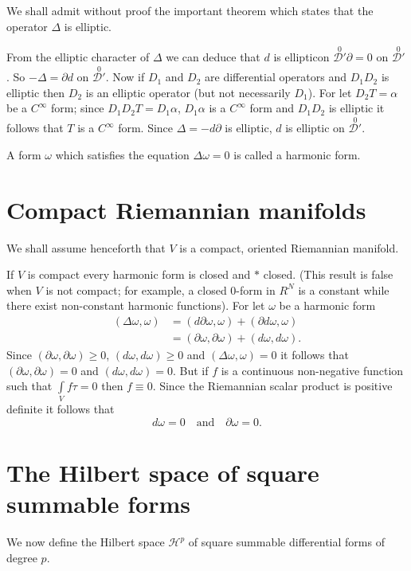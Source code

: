 We shall admit without proof the important theorem which states that
the operator $\Delta$ is elliptic.

From the elliptic character of $\Delta$ we can deduce that $d$ is
elliptic\pageoriginale on $\overset{0}{\mathscr{D}'}\partial =0$ on
$\overset{0}{\mathscr{D}'}$. So $-\Delta=\partial d$ on
$\overset{0}{\mathscr{D}'}$. Now if $D_{1}$ and $D_{2}$ are
differential operators and $D_{1}D_{2}$ is elliptic then $D_{2}$ is an
elliptic operator (but not necessarily $D_{1}$). For let
$D_{2}T=\alpha$ be a $C^{\infty}$ form; since
$D_{1}D_{2}T=D_{1}\alpha$, $D_{1}\alpha$ is a $C^{\infty}$ form and
$D_{1}D_{2}$ is elliptic it follows that $T$ is a $C^{\infty}$
form. Since $\Delta=-d\partial$ is elliptic, $d$ is elliptic on
$\overset{0}{\mathscr{D}'}$. 

A form $\omega$ which satisfies the equation $\Delta\omega=0$ is
called a harmonic form.

\section*{Compact Riemannian manifolds}

We shall assume henceforth that $V$ is a compact, oriented Riemannian
manifold.

If $V$ is compact every harmonic form is closed and $\ast$
closed. (This result is false when $V$ is not compact; for example, a
closed $0$-form in $R^{N}$ is a constant while there exist
non-constant harmonic functions). For let $\omega$ be a harmonic form
\begin{align*}
(\Delta \omega,\omega) &= (d\partial \omega,\omega)+(\partial d\omega,
  \omega)\\
&= (\partial \omega,\partial \omega)+(d\omega,d\omega).
\end{align*}
Since $(\partial \omega,\partial\omega)\geq 0$, $(d\omega,d\omega)\geq
0$ and $(\Delta\omega,\omega)=0$ it follows that $(\partial\omega,
\partial\omega)=0$ and $(d\omega,d\omega)=0$. But if $f$ is a
continuous non-negative function such that $\int\limits_{V}f\tau=0$
then $f\equiv 0$. Since the Riemannian scalar product is positive
definite it follows that 
$$
d\omega=0\quad\text{and}\quad \partial\omega=0.
$$

\section*{The Hilbert space of square summable forms}\pageoriginale

We now define the Hilbert space $\mathscr{H}^{p}$ of square summable
differential forms of degree $p$.

